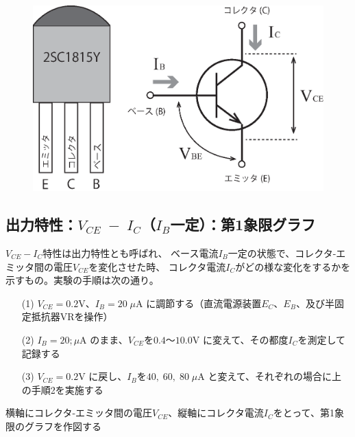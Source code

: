 \documentclass[uplatex,a4paper,11pt,oneside,openany]{jsbook}
\begin{document}
\begin{figure}[H]
	\centering
	\includegraphics[keepaspectratio, scale=0.6, angle=0]
	{figs/eps/illust.eps}
	\label{fig:illust}
\end{figure}

\newpage

\subsection{出力特性：$V_{CE}\;-\;I_C$（$I_B$一定）：第1象限グラフ}

$V_{CE}-I_C$特性は出力特性とも呼ばれ、
ベース電流$I_B$一定の状態で、コレクタ-エミッタ間の電圧$V_{CE}$を変化させた時、
コレクタ電流$I_C$がどの様な変化をするかを示すもの。実験の手順は次の通り。
\begin{enumerate}
\item[(1)] $V_{CE}=0.2$V、$I_B=20\;\mu$A に調節する（直流電源装置$E_C$、$E_B$、及び半固定抵抗器VRを操作）
\item[(2)] $I_B=20;\mu$A のまま、$V_{CE}$を$0.4$〜$10.0$V に変えて、その都度$I_C$を測定して記録する
\item[(3)] $V_{CE}=0.2$V に戻し、$I_B$を$40,\;60,\;80\;\mu$A と変えて、それぞれの場合に上の手順2を実施する    
\end{enumerate}
横軸にコレクタ-エミッタ間の電圧$V_{CE}$、縦軸にコレクタ電流$I_C$をとって、第1象限のグラフを作図する

\vfill
\end{document}
